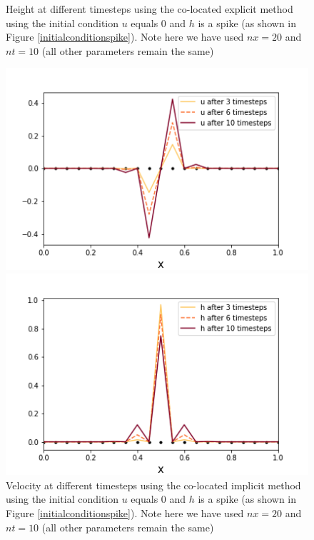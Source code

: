\documentclass[a4paper,12pt, notitlepage]{article}
\begin{document}
\begin{figure} [H]
\begin{minipage}{.5\textwidth}
		\caption{\label{height_colocated_explicit_spike} Height at different timesteps using the co-located explicit method using the initial condition $u$ equals 0 and $h$ is a spike (as shown in Figure \ref{initialconditionspike}). Note here we have used $nx = 20$ and $nt = 10$ (all other parameters remain the same)} 
	\end{minipage}
\end{figure}

\begin{figure} [H]
	\begin{minipage}{.5\textwidth}
		\ContinuedFloat*
		\captionsetup{width=0.9\textwidth}
		\captionsetup{justification=centering}
		\includegraphics[width=\textwidth]{velocity_colocated_implicit_spike.png}
		\caption{\label{velocity_colocated_implicit_spike} Velocity at different timesteps using the co-located implicit method using the initial condition $u$ equals 0 and $h$ is a spike (as shown in Figure \ref{initialconditionspike}). Note here we have used $nx = 20$ and $nt = 10$ (all other parameters remain the same)} 
	\end{minipage}
	\begin{minipage}{.5\textwidth}
		\ContinuedFloat
		\captionsetup{width=0.9\textwidth}
		\captionsetup{justification=centering}
		\includegraphics[width=\textwidth]{height_colocated_implicit_spike.png}

\end{minipage}
\end{figure}
\end{document}
